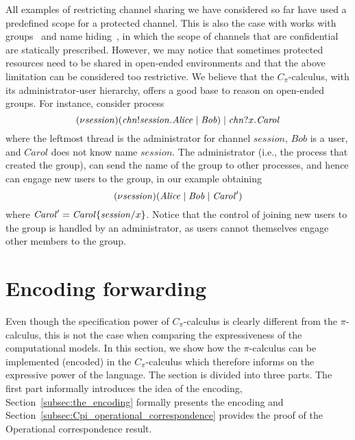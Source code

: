 All examples of restricting channel sharing we have considered so far have used a predefined scope for a protected channel. This is also the case with works with groups~\cite{cardelli05} and name hiding~\cite{Giunti}, in which the scope of channels that are confidential are statically prescribed. 
However, we may notice that sometimes protected resources need to be shared in open-ended environments and that the above limitation can be considered too restrictive. 
We believe that the $C_\pi$-calculus, with its administrator-user hierarchy, offers a good base to reason on open-ended groups. 
For instance, consider process
\[
(\nu \mathit{session}) (\mathit{chn}!\mathit{session}.\mathit{Alice} \;|\; \mathit{Bob}) \;|\; \mathit{chn}?x.\mathit{Carol}
\] 
where the leftmost thread is the administrator for channel $\mathit{session}$, $\mathit{Bob}$ is a user, and $\mathit{Carol}$ does not know name $\mathit{session}$. 
The administrator (i.e., the process that created the group), can send the name of the group to other processes, and hence can engage new users to the group, in our example obtaining 
\[
(\nu \mathit{session}) (\mathit{Alice} \;|\; \mathit{Bob} \;|\; \mathit{Carol}')
\]
where $\mathit{Carol}'=\mathit{Carol}\{\mathit{session}/x\}$. Notice that the control of joining new users to the group is handled by an administrator, as users cannot themselves engage other members to the group.
















\section{Encoding forwarding}\label{sec:encoding}


Even though the specification power of $C_\pi$-calculus is clearly different from the $\pi$-calculus, this is not the case when comparing the expressiveness of the computational models. In this section, we show how the $\pi$-calculus can be implemented (encoded) in the $C_\pi$-calculus which therefore informs on the expressive power of the language. The section is divided into three parts. The first part informally introduces  the idea of the encoding, Section~\ref{subsec:the_encoding} formally presents the encoding and Section~\ref{subsec:Cpi_operational_correspondence} provides the proof of the Operational correspondence result.
%
%

